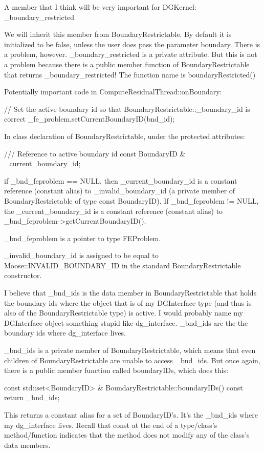 {A member that I think will be very important for DGKernel: _boundary_restricted

We will inherit this member from BoundaryRestrictable. By default it is initialized to be false, unless the user does pass the parameter boundary. There is a problem, however. _boundary_restricted is a private attribute. But this is not a problem because there is a public member function of BoundaryRestrictable that returns _boundary_restricted! The function name is boundaryRestricted()

Potentially important code in ComputeResidualThread::onBoundary:

    // Set the active boundary id so that BoundaryRestrictable::_boundary_id is correct
    _fe_problem.setCurrentBoundaryID(bnd_id);

In class declaration of BoundaryRestrictable, under the protected attributes:

  /// Reference to active boundary id
  const BoundaryID & _current_boundary_id;

if _bnd_feproblem == NULL, then _current_boundary_id is a constant reference (constant alias) to _invalid_boundary_id (a private member of BoundaryRestrictable of type const BoundaryID). If _bnd_feproblem != NULL, the _current_boundary_id is a constant reference (constant alias) to _bnd_feproblem->getCurrentBoundaryID().

_bnd_feproblem is a pointer to type FEProblem.

_invalid_boundary_id is assigned to be equal to Moose::INVALID_BOUNDARY_ID in the standard BoundaryRestrictable constructor.

I believe that _bnd_ids is the data member in BoundaryRestrictable that holds the boundary ids where the object that is of my DGInterface type (and thus is also of the BoundaryRestrictable type) is active. I would probably name my DGInterface object something stupid like dg_interface. _bnd_ids are the the boundary ids where dg_interface lives.

_bnd_ids is a private member of BoundaryRestrictable, which means that even children of BoundaryRestrictable are unable to access _bnd_ids. But once again, there is a public member function called boundaryIDs, which does this:

const std::set<BoundaryID> &
BoundaryRestrictable::boundaryIDs() const
{
  return _bnd_ids;
}

This returns a constant alias for a set of BoundaryID's. It's the _bnd_ids where my dg_interface lives. Recall that const at the end of a type/class's method/function indicates that the method does not modify any of the class's data members.

}
